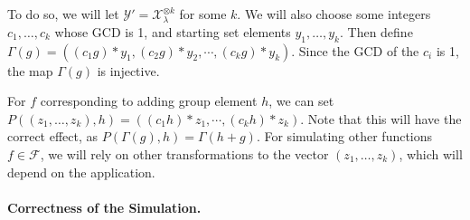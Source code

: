 \documentclass{article}\usepackage[a4paper,margin=20mm]{geometry}
\numberwithin{theorem}{section}
\numberwithin{equation}{section}
\newcommand{\Fs}{{\mathcal{F}}}
\newcommand{\Xs}{{\mathcal{X}}}
\newcommand{\Ys}{{\mathcal{Y}}}
\begin{document}
To do so, we will let $\Ys'=\Xs_\lambda^{\otimes k}$ for some $k$. We will also choose some integers $c_1,\dots,c_k$ whose GCD is 1, and starting set elements $y_1,\dots,y_k$. Then define $\Gamma(g)=((c_1g)*y_1,(c_2g)*y_2,\cdots,(c_kg)*y_k)$. Since the GCD of the $c_i$ is 1, the map $\Gamma(g)$ is injective. 

For $f$ corresponding to adding group element $h$, we can set $P((z_1,\dots,z_k),h)=((c_1h)*z_1,\cdots,(c_kh)*z_k)$. Note that this will have the correct effect, as $P(\Gamma(g),h)=\Gamma(h+g)$. For simulating other functions $f\in\Fs$, we will rely on other transformations to the vector $(z_1,\dots,z_k)$, which will depend on the application.


\paragraph{Correctness of the Simulation.}
\end{document}
